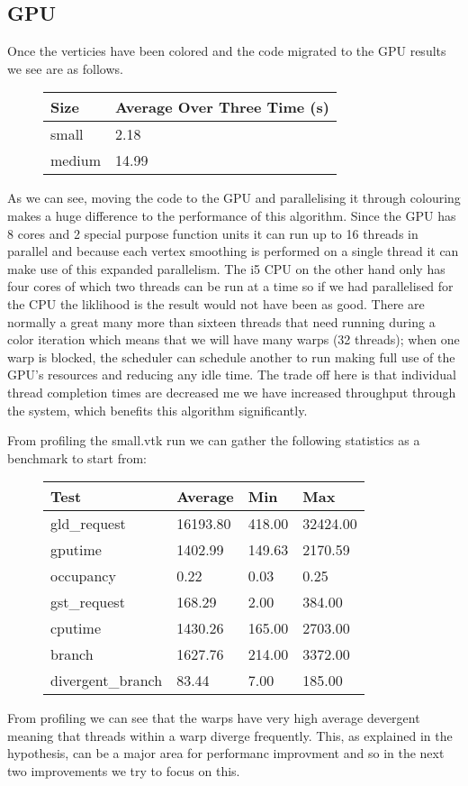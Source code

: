 \subsection*{GPU}
Once the verticies have been colored and the code migrated to the GPU results we see are as follows.\\
\begin{figure}[H]\centering \begin{tabular}{ l | l }
  \hline
  Size & Average Over Three Time (s) \\
  \hline
  \hline
  small & 2.18 \\
  medium & 14.99 \\
  \hline
\end{tabular} \end{figure}

As we can see, moving the code to the GPU and parallelising it through colouring makes a huge difference to the performance of this algorithm. Since the GPU has 8 cores and 2 special purpose function units it can run up to 16 threads in parallel and because each vertex smoothing is performed on a single thread it can make use of this expanded parallelism. The i5 CPU on the other hand only has four cores of which two threads can be run at a time so if we had parallelised for the CPU the liklihood is the result would not have been as good. There are normally a great many more than sixteen threads that need running during a color iteration which means that we will have many warps (32 threads); when one warp is blocked, the scheduler can schedule another to run making full use of the GPU's resources and reducing any idle time.
The trade off here is that individual thread completion times are decreased me we have increased throughput through the system, which benefits this algorithm significantly.

From profiling the small.vtk run we can gather the following statistics as a benchmark to start from:\\
\begin{figure}[H]\centering \begin{tabular}{ l | l | l | l}
\hline
Test & Average & Min & Max \\
\hline
\hline
gld\_request & 16193.80 & 418.00 & 32424.00 \\
gputime & 1402.99 & 149.63 & 2170.59 \\
occupancy & 0.22 & 0.03 & 0.25 \\
gst\_request & 168.29 & 2.00 & 384.00 \\
cputime & 1430.26 & 165.00 & 2703.00 \\
branch & 1627.76 & 214.00 & 3372.00 \\
divergent\_branch & 83.44 & 7.00 & 185.00 \\
\hline
\end{tabular} \end{figure}

From profiling we can see that the warps have very high average devergent meaning that threads within a warp diverge frequently. This, as explained in the hypothesis, can be a major area for performanc improvment and so in the next two improvements we try to focus on this.
